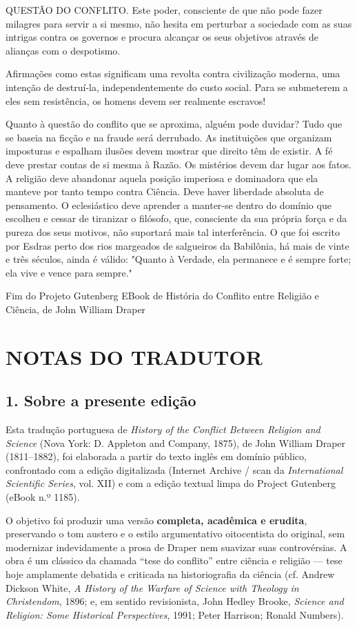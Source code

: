 \documentclass[11pt,a5paper,twoside,openany]{book}
\begin{document}
QUESTÃO DO CONFLITO. Este poder, consciente de que não pode fazer milagres para servir a si mesmo, não hesita em perturbar a sociedade com as suas intrigas contra os governos e procura alcançar os seus objetivos através de alianças com o despotismo.

Afirmações como estas significam uma revolta contra civilização moderna, uma intenção de destruí-la, independentemente do custo social. Para se submeterem a eles sem resistência, os homens devem ser realmente escravos!

Quanto à questão do conflito que se aproxima, alguém pode duvidar? Tudo que se baseia na ficção e na fraude será derrubado. As instituições que organizam imposturas e espalham ilusões devem mostrar que direito têm de existir. A fé deve prestar contas de si mesma à Razão. Os mistérios devem dar lugar aos fatos. A religião deve abandonar aquela posição imperiosa e dominadora que ela manteve por tanto tempo contra Ciência. Deve haver liberdade absoluta de pensamento. O eclesiástico deve aprender a manter-se dentro do domínio que escolheu e cessar de tiranizar o filósofo, que, consciente da sua própria força e da pureza dos seus motivos, não suportará mais tal interferência. O que foi escrito por Esdras perto dos rios margeados de salgueiros da Babilônia, há mais de vinte e três séculos, ainda é válido: "Quanto à Verdade, ela permanece e é sempre forte; ela vive e vence para sempre."

Fim do Projeto Gutenberg EBook de História do Conflito entre Religião e Ciência, de John William Draper

\clearpage
\chapter*{NOTAS DO TRADUTOR}
\section*{1. Sobre a presente edição}
Esta tradução portuguesa de \textit{History of the Conflict Between Religion and Science} (Nova York: D. Appleton and Company, 1875), de John William Draper (1811–1882), foi elaborada a partir do texto inglês em domínio público, confrontado com a edição digitalizada (Internet Archive / scan da \textit{International Scientific Series}, vol. XII) e com a edição textual limpa do Project Gutenberg (eBook n.º 1185).

O objetivo foi produzir uma versão \textbf{completa, acadêmica e erudita}, preservando o tom austero e o estilo argumentativo oitocentista do original, sem modernizar indevidamente a prosa de Draper nem suavizar suas controvérsias. A obra é um clássico da chamada “tese do conflito” entre ciência e religião — tese hoje amplamente debatida e criticada na historiografia da ciência (cf. Andrew Dickson White, \textit{A History of the Warfare of Science with Theology in Christendom}, 1896; e, em sentido revisionista, John Hedley Brooke, \textit{Science and Religion: Some Historical Perspectives}, 1991; Peter Harrison; Ronald Numbers).
\end{document}
